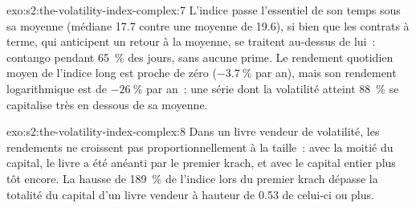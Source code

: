 \begin{solution}{exo:s2:the-volatility-index-complex:7}
L'indice passe l'essentiel de son temps sous sa moyenne (médiane 17.7 contre une moyenne de 19.6), si bien que les contrats à terme, qui anticipent un retour à la moyenne, se traitent au-dessus de lui~: contango pendant 65~\%
des jours, sans aucune prime. Le rendement quotidien moyen de l'indice long est proche de zéro ($-3.7~\%$ par an), mais son rendement logarithmique est de $-26~\%$ par an~:
une série dont la volatilité atteint 88~\% se capitalise très en dessous de sa moyenne.
\end{solution}

\begin{solution}{exo:s2:the-volatility-index-complex:8}
Dans un livre vendeur de volatilité, les rendements ne croissent pas proportionnellement à la taille~: avec la moitié du capital, le livre a été anéanti par le premier krach, et avec le capital entier
plus tôt encore. La hausse de 189~\% de l'indice lors du premier krach dépasse la totalité du capital d'un livre vendeur à hauteur de 0.53 de celui-ci ou plus.
\end{solution}

